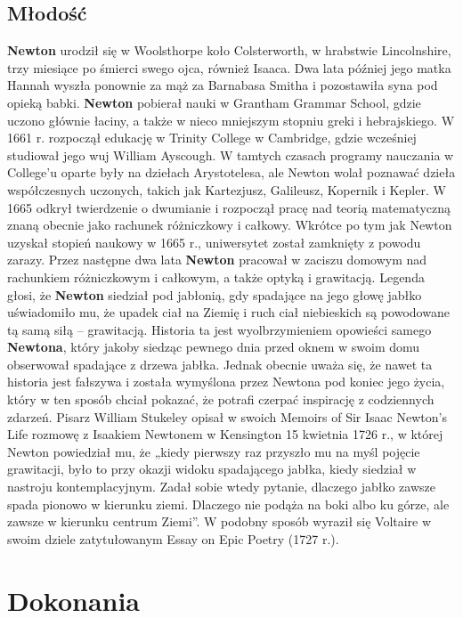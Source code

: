 \documentclass{article}
\begin{document}
\subsection{Młodość}
\textbf{Newton} urodził się w Woolsthorpe koło Colsterworth, w hrabstwie Lincolnshire, trzy miesiące po śmierci swego ojca, również Isaaca. Dwa lata później jego matka Hannah wyszła ponownie za mąż za Barnabasa Smitha i pozostawiła syna pod opieką babki.\newline
\textbf{Newton} pobierał nauki w Grantham Grammar School, gdzie uczono głównie łaciny, a także w nieco mniejszym stopniu greki i hebrajskiego. W 1661 r. rozpoczął edukację w Trinity College w Cambridge, gdzie wcześniej studiował jego wuj William Ayscough. W tamtych czasach programy nauczania w College’u oparte były na dziełach Arystotelesa, ale Newton wolał poznawać dzieła współczesnych uczonych, takich jak Kartezjusz, Galileusz, Kopernik i Kepler. W 1665 odkrył twierdzenie o dwumianie i rozpoczął pracę nad teorią matematyczną znaną obecnie jako rachunek różniczkowy i całkowy. Wkrótce po tym jak Newton uzyskał stopień naukowy w 1665 r., uniwersytet został zamknięty z powodu zarazy. Przez następne dwa lata \textbf{Newton} pracował w zaciszu domowym nad rachunkiem różniczkowym i całkowym, a także optyką i grawitacją.\newline
Legenda głosi, że \textbf{Newton} siedział pod jabłonią, gdy spadające na jego głowę jabłko uświadomiło mu, że upadek ciał na Ziemię i ruch ciał niebieskich są powodowane tą samą siłą – grawitacją. Historia ta jest wyolbrzymieniem opowieści samego \textbf{Newtona}, który jakoby siedząc pewnego dnia przed oknem w swoim domu obserwował spadające z drzewa jabłka. Jednak obecnie uważa się, że nawet ta historia jest fałszywa i została wymyślona przez Newtona pod koniec jego życia, który w ten sposób chciał pokazać, że potrafi czerpać inspirację z codziennych zdarzeń. Pisarz William Stukeley opisał w swoich Memoirs of Sir Isaac Newton’s Life rozmowę z Isaakiem Newtonem w Kensington 15 kwietnia 1726 r., w której Newton powiedział mu, że „kiedy pierwszy raz przyszło mu na myśl pojęcie grawitacji, było to przy okazji widoku spadającego jabłka, kiedy siedział w nastroju kontemplacyjnym. Zadał sobie wtedy pytanie, dlaczego jabłko zawsze spada pionowo w kierunku ziemi. Dlaczego nie podąża na boki albo ku górze, ale zawsze w kierunku centrum Ziemi”. W podobny sposób wyraził się Voltaire w swoim dziele zatytułowanym Essay on Epic Poetry (1727 r.).


\section{Dokonania}
\end{document}
